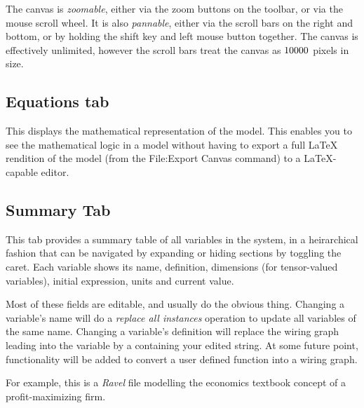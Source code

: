The canvas is {\em zoomable}, either via the zoom buttons on the
toolbar, or via the mouse scroll wheel. It is also {\em pannable},
either via the scroll bars on the right and bottom, or by holding
the shift key and left mouse button together. The canvas is effectively
unlimited, however the scroll bars treat the canvas as $10000\time10000$
pixels in size.


\subsection{Equations tab}

\label{tabs:Equations}

This displays the mathematical representation of the model. This enables
you to see the mathematical logic in a model without having to export
a full LaTeX rendition of the model (from the File:Export Canvas command)
to a LaTeX-capable editor.

\subsection{Summary Tab}

\label{tabs:Summary}

This tab provides a summary table of all variables in the system,
in a heirarchical fashion that can be navigated by expanding or hiding
sections by toggling the caret. Each variable shows its name, definition,
dimensions (for tensor-valued variables), initial expression, units
and current value.

Most of these fields are editable, and usually do the obvious thing.
Changing a variable's name will do a {\em replace all instances}
operation to update all variables of the same name. Changing a variable's
definition will replace the wiring graph leading into the variable
by a  containing
your edited string. At some future point, functionality will be added
to convert a user defined function into a wiring graph.

For example, this is a \emph{Ravel} file modelling the economics textbook
concept of a profit-maximizing firm.

